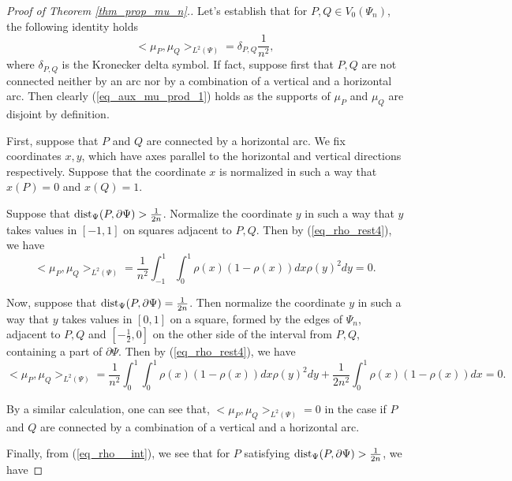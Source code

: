 \documentclass[12pt]{article}
\numberwithin{equation}{section}
\theoremstyle{theorem}
\theoremstyle{definition}
\theoremstyle{remark}
\newcommand{\dist}{{\rm{dist}}}
\newcommand{\scal}[2]{\big< #1, #2 \big>}
\begin{document}
	\begin{proof}[Proof of Theorem  \ref{thm_prop_mu_n}.]
		Let's establish that for $P, Q \in V_0(\Psi_n)$, the following identity holds
		\begin{equation}\label{eq_aux_mu_prod_1}
			\scal{\mu_P}{\mu_Q}_{L^2(\Psi)} = \delta_{P, Q} \frac{1}{n^2},
		\end{equation}
		where $\delta_{P, Q}$ is the Kronecker delta symbol.
		If fact, suppose first that $P, Q$ are not connected neither by an arc nor by a combination of a vertical and a horizontal arc.
		Then clearly  (\ref{eq_aux_mu_prod_1}) holds as the supports of $\mu_P$ and $\mu_Q$ are disjoint by definition.
		\par 
		First, suppose that $P$ and $Q$ are connected by a horizontal arc.
		We fix coordinates $x, y$, which have axes parallel to the horizontal and vertical directions respectively. 
		Suppose that the coordinate $x$ is normalized in such a way that $x(P) = 0$ and $x(Q) = 1$.
		\par 
		Suppose that $\dist_{\Psi}(P, \partial \Psi) > \frac{1}{2n}$. Normalize the coordinate $y$ in such a way that $y$ takes values in $[-1, 1]$ on squares adjacent to $P, Q$.
		Then by (\ref{eq_rho_rest4}), we have
		\begin{equation}\label{eq_mu_ort}
			\scal{\mu_P}{\mu_Q}_{L^2(\Psi)}  = \frac{1}{n^2} \int_{-1}^{1} \int_{0}^{1} \rho(x)(1-\rho(x)) dx \rho(y)^2 dy = 0.
		\end{equation}
		\par Now, suppose that $\dist_{\Psi}(P, \partial \Psi) = \frac{1}{2n}$. Then normalize the coordinate $y$ in such a way that $y$ takes values in $[0, 1]$ on a square, formed by the edges of $\Psi_n$, adjacent to $P, Q$ and $[-\frac{1}{2}, 0]$ on the other side of the interval from $P, Q$, containing a part of $\partial \Psi$.
		Then by (\ref{eq_rho_rest4}), we have
		\begin{equation}\label{eq_mu_ort2}
			\scal{\mu_P}{\mu_Q}_{L^2(\Psi)}  = \frac{1}{n^2} \int_{0}^{1} \int_{0}^{1} \rho(x)(1-\rho(x)) dx \rho(y)^2 dy  + \frac{1}{2n^2} \int_{0}^{1} \rho(x)(1-\rho(x)) dx= 0.
		\end{equation}
		\par 
		By a similar calculation, one can see that, $\scal{\mu_P}{\mu_Q}_{L^2(\Psi)} = 0$ in the case if $P$ and $Q$ are connected by a combination of a vertical and a horizontal arc.
		\par Finally, from (\ref{eq_rho__int}), we see that for $P$ satisfying  $\dist_{\Psi}(P, \partial \Psi) > \frac{1}{2n}$, we have

\end{proof}
\end{document}
